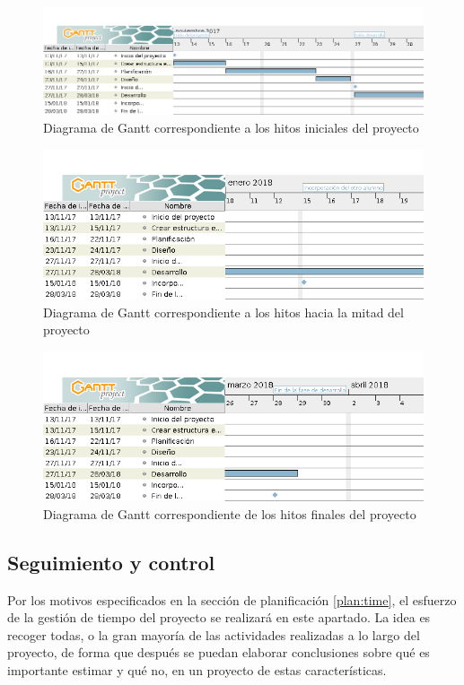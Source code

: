 \begin{figure}[h]
    \center
    \includegraphics[angle=90,scale=0.5]{img/gantt-start}
    \caption{Diagrama de Gantt correspondiente a los hitos iniciales del
      proyecto}
    \label{fig:diag:start}
\end{figure}

\begin{figure}[h]
    \center
    \includegraphics[angle=90,scale=0.5]{img/gantt-middle}
    \caption{Diagrama de Gantt correspondiente a los hitos hacia la mitad del
      proyecto}
    \label{fig:diag:middle}
\end{figure}

\begin{figure}[h]
    \center
    \includegraphics[angle=90,scale=0.5]{img/gantt-end}
    \caption{Diagrama de Gantt correspondiente de los hitos finales del
    proyecto}
    \label{fig:diag:end}
\end{figure}

\subsection{Seguimiento y control}
\label{subsec:syc:timeManagement}
Por los motivos especificados en la sección de planificación \ref{plan:time},
el esfuerzo de la gestión de tiempo del proyecto se realizará en este apartado.
La idea es recoger todas, o la gran mayoría de las actividades realizadas a lo
largo del proyecto, de forma que después se puedan elaborar conclusiones sobre
qué es importante estimar y qué no, en un proyecto de estas características.

